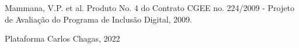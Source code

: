 \documentclass[
12pt,		%
openright,	%
twoside,  %
a4paper,			%
chapter=TITLE,		%
english,			%
french,				%
spanish,			%
brazil				%
]{USPSC-classe/USPSC}
\begin{document}
\begin{flushleft}
\begin{flushleft}
\begin{flushleft}
\begin{flushleft}
\begin{flushleft}
\begin{flushleft}
\begin{flushleft}
\begin{flushleft}
\begin{flushleft}
[CGEE, 2010a] Mammana, V.P. et al. Produto No. 4 do Contrato CGEE no. 224/2009 - Projeto de Avalia\c{c}\~ao do Programa de Inclus\~ao Digital, 2009.
\end{flushleft}


\end{flushleft}


\end{flushleft}


\end{flushleft}


\end{flushleft}


\end{flushleft}


\end{flushleft}


\end{flushleft}


\end{flushleft}


\begin{flushleft}
\begin{flushleft}
\begin{flushleft}
\begin{flushleft}
\begin{flushleft}
\begin{flushleft}
\begin{flushleft}
\begin{flushleft}
\begin{flushleft}
[CHAGAS, 2022] Plataforma Carlos Chagas, 2022
\end{flushleft}


\end{flushleft}


\end{flushleft}


\end{flushleft}


\end{flushleft}


\end{flushleft}


\end{flushleft}


\end{flushleft}


\end{flushleft}
\end{document}
